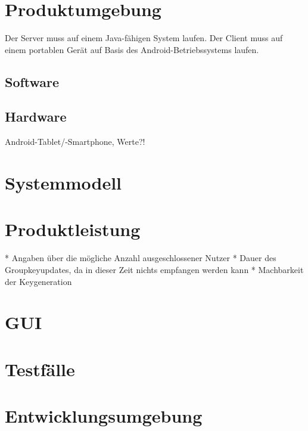 \documentclass[a4paper,10pt]{article}
\begin{document}
\section{Produktumgebung}
Der Server muss auf einem Java-fähigen System laufen.
Der Client muss auf einem portablen Gerät auf Basis des Android-Betriebssystems laufen.
\subsection{Software}

\subsection{Hardware}
Android-Tablet/-Smartphone, Werte?!

\section{Systemmodell}

\section{Produktleistung}
* Angaben über die mögliche Anzahl ausgeschlossener Nutzer
* Dauer des Groupkeyupdates, da in dieser Zeit nichts empfangen werden kann
* Machbarkeit der Keygeneration

\section{GUI}

\section{Testfälle}

\section{Entwicklungsumgebung}

\clearpage

\end{document}
